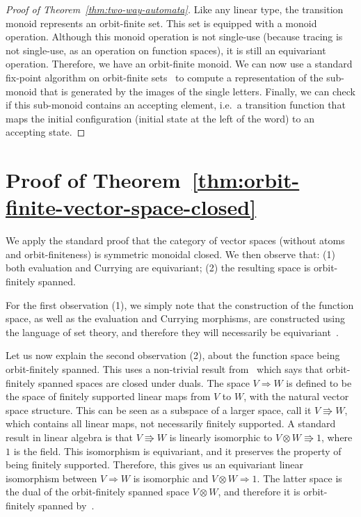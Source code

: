 \documentclass[10pt,a4paper]{amsart}
\numberwithin{equation}{section}
\theoremstyle{plain}
\newcommand{\funspace}[2]{#1 \Rightarrow #2}
\newcommand{\funspacenonfs}[2]{#1 \Rrightarrow  #2}
\begin{document}
\begin{proof}[Proof of Theorem~\ref{thm:two-way-automata}]
        Like any linear type, the transition monoid represents an orbit-finite set. This set is equipped with a monoid operation. Although this monoid operation is not single-use (because tracing is not single-use, as an operation on function spaces), it is still an equivariant operation. Therefore, we have an orbit-finite monoid. We can now use a standard fix-point algorithm on orbit-finite sets~\cite{bojanczyk_slightly2018} to compute a representation of the sub-monoid that is generated by the images of the single letters. Finally, we can check if this sub-monoid contains an accepting element, i.e.~a transition function that maps the initial configuration (initial state at the left of the word) to an accepting state. 
\end{proof}


\section{Proof of Theorem~\ref{thm:orbit-finite-vector-space-closed}}
 We apply the standard proof that the category of vector spaces (without atoms and orbit-finiteness) is symmetric monoidal closed. We then observe that: (1) both evaluation and Currying are equivariant; (2) the resulting space is orbit-finitely spanned. 
    
    For the first observation (1), we simply note that the construction of the function space, as well as  the evaluation and Currying morphisms, are constructed using the language of set theory, and therefore they will necessarily be equivariant~\cite[Equivariance Principle]{bojanczyk_slightly2018}.

    Let us now explain the second observation (2), about the function space being orbit-finitely spanned. This uses a non-trivial result from~\cite{bojanczykKM21OrbitFiniteVector} which says that orbit-finitely spanned spaces are closed under duals. 
    The space $\funspace V W$ is defined to be the space of finitely supported linear maps from $V$ to $W$, with the natural vector space structure. This can be seen as a subspace of a larger space, call it $\funspacenonfs V W$, which contains all linear maps, not necessarily finitely supported. A standard result in linear algebra is that $\funspacenonfs V W$ is linearly isomorphic to $ \funspacenonfs {V \otimes W} 1$, where $1$ is the field. This isomorphism is equivariant, and it preserves the property of being finitely supported. Therefore, this gives us an equivariant linear isomorphism between $\funspace V W$ is isomorphic and $ \funspace {V \otimes W} 1$. The latter space is the dual of the orbit-finitely spanned space $V \otimes W$, and therefore it is orbit-finitely spanned by~\cite[Corollary VI.5]{bojanczykKM21OrbitFiniteVector}.
\end{document}
